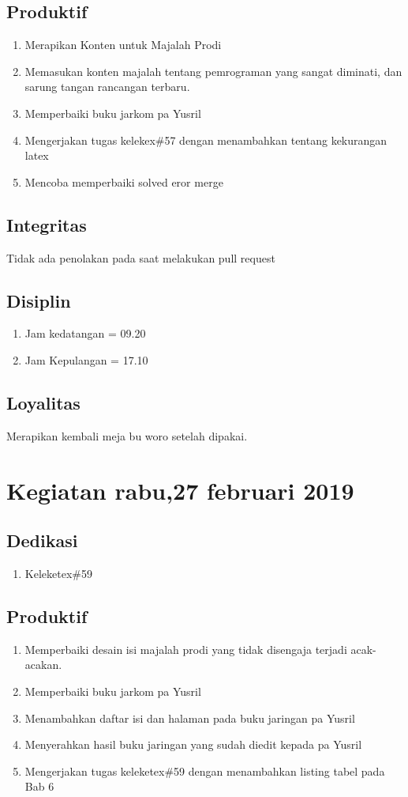 \subsection{Produktif}
\begin{enumerate}
\item Merapikan Konten untuk Majalah Prodi
\item Memasukan konten majalah tentang pemrograman yang sangat diminati, dan sarung tangan rancangan terbaru.
\item Memperbaiki buku jarkom pa Yusril
\item Mengerjakan tugas kelekex\#57 dengan menambahkan tentang kekurangan latex
\item Mencoba memperbaiki solved eror merge
\end{enumerate}
\subsection{Integritas}
Tidak ada penolakan pada saat melakukan pull request
\subsection{Disiplin}
\begin{enumerate}
\item Jam kedatangan = 09.20
\item Jam Kepulangan = 17.10
\end{enumerate}
\subsection{Loyalitas}
Merapikan kembali meja bu woro setelah dipakai.


\section{ Kegiatan rabu,27 februari 2019}
\subsection{Dedikasi}
\begin{enumerate}
\item Keleketex\#59
\end{enumerate}
\subsection{Produktif}
\begin{enumerate}
\item Memperbaiki desain isi majalah prodi yang tidak disengaja terjadi acak-acakan.
\item Memperbaiki buku jarkom pa Yusril
\item Menambahkan daftar isi dan halaman pada buku jaringan pa Yusril
\item Menyerahkan hasil buku jaringan yang sudah diedit kepada pa Yusril
\item Mengerjakan tugas keleketex\#59 dengan menambahkan listing tabel pada Bab 6
\end{enumerate}
